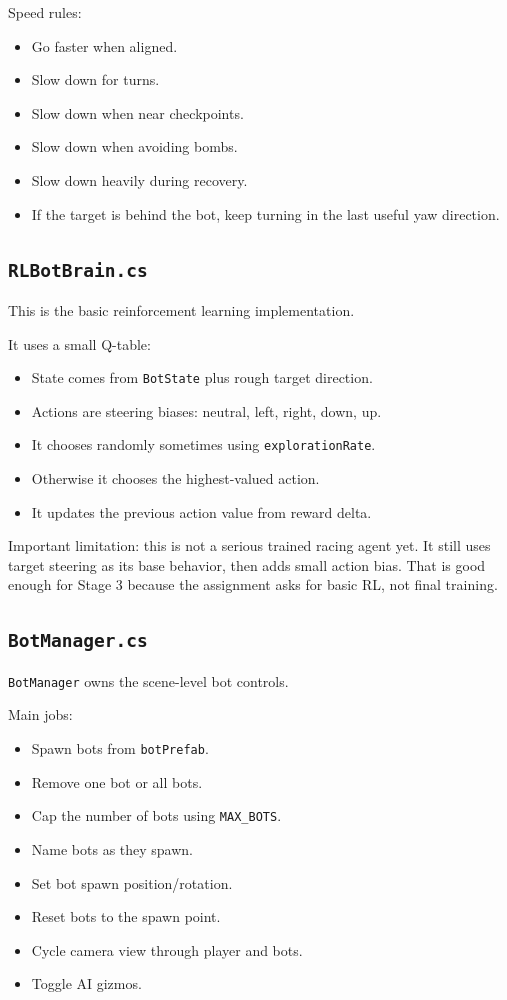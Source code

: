 \documentclass[11pt]{article}
\newcommand{\file}[1]{\texttt{#1}}
\newcommand{\code}[1]{{\footnotesize\texttt{#1}}}
\begin{document}
Speed rules:

\begin{itemize}
    \item Go faster when aligned.
    \item Slow down for turns.
    \item Slow down when near checkpoints.
    \item Slow down when avoiding bombs.
    \item Slow down heavily during recovery.
    \item If the target is behind the bot, keep turning in the last useful yaw direction.
\end{itemize}

\subsection{\file{RLBotBrain.cs}}

This is the basic reinforcement learning implementation.

It uses a small Q-table:

\begin{itemize}
    \item State comes from \code{BotState} plus rough target direction.
    \item Actions are steering biases: neutral, left, right, down, up.
    \item It chooses randomly sometimes using \code{explorationRate}.
    \item Otherwise it chooses the highest-valued action.
    \item It updates the previous action value from reward delta.
\end{itemize}

Important limitation: this is not a serious trained racing agent yet. It still uses target steering as its base behavior, then adds small action bias. That is good enough for Stage 3 because the assignment asks for basic RL, not final training.

\subsection{\file{BotManager.cs}}

\code{BotManager} owns the scene-level bot controls.

Main jobs:

\begin{itemize}
    \item Spawn bots from \code{botPrefab}.
    \item Remove one bot or all bots.
    \item Cap the number of bots using \code{MAX\_BOTS}.
    \item Name bots as they spawn.
    \item Set bot spawn position/rotation.
    \item Reset bots to the spawn point.
    \item Cycle camera view through player and bots.
    \item Toggle AI gizmos.
\end{itemize}
\end{document}
